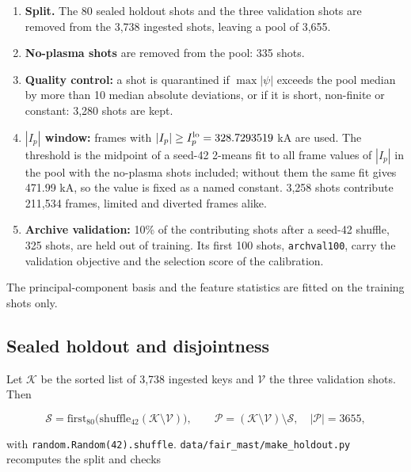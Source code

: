 \documentclass[11pt,a4paper]{article}
\numberwithin{equation}{section}
\begin{document}
\begin{enumerate}
\def\labelenumi{\arabic{enumi}.}
\item
  \textbf{Split.} The 80 sealed holdout shots and the three validation shots are removed from the 3,738 ingested shots, leaving a pool of 3,655.
\item
  \textbf{No-plasma shots} are removed from the pool: 335 shots.
\item
  \textbf{Quality control:} a shot is quarantined if \(\max|\psi|\) exceeds the pool median by more than 10 median absolute deviations, or if it is short, non-finite or constant: 3,280 shots are kept.
\item
  \textbf{\(|I_p|\) window:} frames with \(|I_p|\ge I_p^{\rm lo}=328.7293519\) kA are used. The threshold is the midpoint of a seed-42 2-means fit to all frame values of \(|I_p|\) in the pool with the no-plasma shots included; without them the same fit gives 471.99 kA, so the value is fixed as a named constant. 3,258 shots contribute 211,534 frames, limited and diverted frames alike.
\item
  \textbf{Archive validation:} 10\% of the contributing shots after a seed-42 shuffle, 325 shots, are held out of training. Its first 100 shots, \texttt{archval100}, carry the validation objective and the selection score of the calibration.
\end{enumerate}

The principal-component basis and the feature statistics are fitted on the training shots only.

\hypertarget{sealed-holdout-and-disjointness}{%
\subsection{Sealed holdout and disjointness}\label{sealed-holdout-and-disjointness}}

Let \(\mathcal K\) be the sorted list of 3,738 ingested keys and \(\mathcal V\) the three validation shots. Then

\[
\mathcal S = \mathrm{first}_{80}\big(\mathrm{shuffle}_{42}(\mathcal K\setminus\mathcal V)\big),\qquad
\mathcal P = (\mathcal K\setminus\mathcal V)\setminus\mathcal S,\quad |\mathcal P| = 3655,
\]

with \texttt{random.Random(42).shuffle}. \nolinkurl{data/fair_mast/make_holdout.py} recomputes the split and checks
\end{document}
